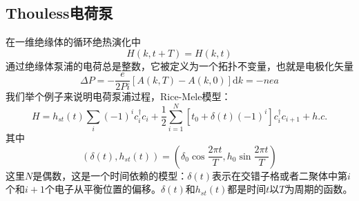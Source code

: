 \documentclass{article}
\numberwithin{equation}{subsection}
\begin{document}
\subsection{Thouless电荷泵}
在一维绝缘体的循环绝热演化中
\begin{equation}
    H(k,t+T)=H(k,t)
\end{equation}
通过绝缘体泵浦的电荷总是整数，它被定义为一个拓扑不变量，也就是电极化矢量
\begin{equation}
    \Delta P=-\frac{e}{2Pi}[A(k,T)-A(k,0)]\mathrm{d}k=-nea
\end{equation}
我们举个例子来说明电荷泵浦过程，Rice-Mele模型：
\begin{equation}
    H=h_{st}(t)\sum_{i}(-1)^ic_i^\dagger c_i+\frac{1}{2}\sum_{i=1}^N[t_0+\delta(t)(-1)^i]c_i^\dagger c_{i+1}+h.c.
\end{equation}
其中
\begin{equation}
    (\delta(t),h_{st}(t))=\left(\delta_0\cos\frac{2\pi t}{T},h_0\sin\frac{2\pi t}{T}\right)
\end{equation}
这里$N$是偶数，这是一个时间依赖的模型：$\delta(t)$表示在交错子格或者二聚体中第$i$个和$i+1$个电子从平衡位置的偏移。$\delta(t)$和$h_{st}(t)$都是时间$t$以$T$为周期的函数。
\end{document}
